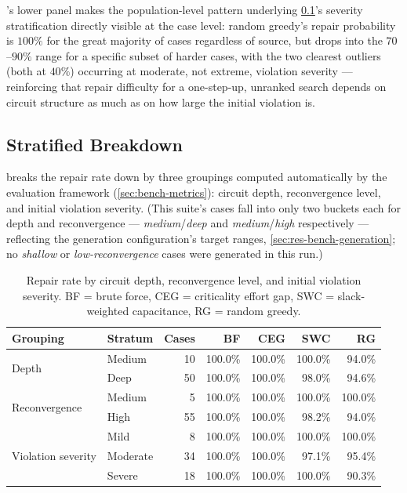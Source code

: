 's lower panel makes the population-level
pattern underlying \cref{sec:res-bench-strata}'s severity stratification
directly visible at the case level: random greedy's repair probability is
$100\%$ for the great majority of cases regardless of source, but drops
into the $70$--$90\%$ range for a specific subset of harder cases, with
the two clearest outliers (both at $40\%$) occurring at moderate, not
extreme, violation severity --- reinforcing that repair difficulty for a
one-step-up, unranked search depends on circuit structure as much as on
how large the initial violation is.
 
\subsection{Stratified Breakdown}
\label{sec:res-bench-strata}
 
 breaks the repair rate down by three groupings
computed automatically by the evaluation framework
(\cref{sec:bench-metrics}): circuit depth, reconvergence level, and
initial violation severity. (This suite's cases fall into only two buckets
each for depth and reconvergence --- \emph{medium}/\emph{deep} and
\emph{medium}/\emph{high} respectively --- reflecting the generation
configuration's target ranges, \cref{sec:res-bench-generation}; no
\emph{shallow} or \emph{low-reconvergence} cases were generated in this
run.)
 
\begin{table}[H]
\centering
\small
\begin{tabular}{@{}llrrrrr@{}}
\toprule
\textbf{Grouping} & \textbf{Stratum} & \textbf{Cases} & \textbf{BF} & \textbf{CEG} & \textbf{SWC} & \textbf{RG} \\
\midrule
\multirow{2}{*}{Depth} & Medium & 10 & 100.0\% & 100.0\% & 100.0\% & 94.0\% \\
 & Deep & 50 & 100.0\% & 100.0\% & 98.0\% & 94.6\% \\
\multirow{2}{*}{Reconvergence} & Medium & 5 & 100.0\% & 100.0\% & 100.0\% & 100.0\% \\
 & High & 55 & 100.0\% & 100.0\% & 98.2\% & 94.0\% \\
\multirow{3}{*}{Violation severity} & Mild & 8 & 100.0\% & 100.0\% & 100.0\% & 100.0\% \\
 & Moderate & 34 & 100.0\% & 100.0\% & 97.1\% & 95.4\% \\
 & Severe & 18 & 100.0\% & 100.0\% & 100.0\% & 90.3\% \\
\bottomrule
\end{tabular}
\caption{Repair rate by circuit depth, reconvergence level, and initial
violation severity. BF = brute force, CEG = criticality effort gap,
SWC = slack-weighted capacitance, RG = random greedy.}
\label{tab:bench-strata}
\end{table}
 
